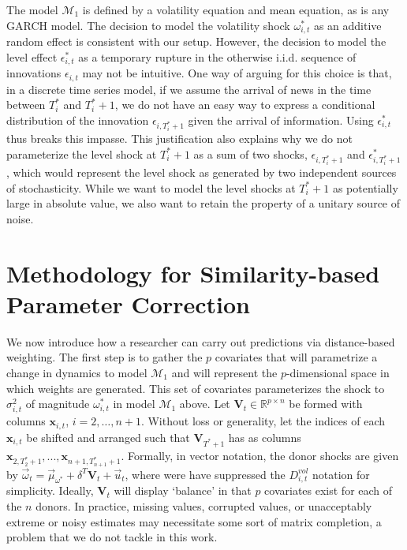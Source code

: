 \documentclass{uiucthesis2021}
\newcommand{\x}{\textbf{x}}
\def\mc#1{\mathcal{#1}} %
\def\mc#1{\mathcal{#1}}
\theoremstyle{definition}
\begin{document}
The model $\mc{M}_1$ is defined by a volatility equation and mean equation, as is any GARCH model.  The decision to model the volatility shock $\omega^{*}_{i,t}$ as an additive random effect is consistent with our setup.  However, the decision to model the level effect $\epsilon^{*}_{i,t}$ as a temporary rupture in the otherwise i.i.d. sequence of innovations $\epsilon_{i,t}$ may not be intuitive.  One way of arguing for this choice is that, in a discrete time series model, if we assume the arrival of news in the time between $T_{i}^{*}$ and $T_{i}^{*}+1$, we do not have an easy way to express a conditional distribution of the innovation $\epsilon_{i,T_{i}^{*}+1}$ given the arrival of information.  Using $\epsilon^{*}_{i,t}$ thus breaks this impasse.  This justification also explains why we do not parameterize the level shock at $T_{i}^{*}+1$ as a sum of two shocks, $\epsilon_{i,T_{i}^{*}+1}$ and $\epsilon^{*}_{i,T_{i}^{*}+1}$, which would represent the level shock as generated by two independent sources of stochasticity. While we want to model the level shocks at $T_{i}^{*}+1$ as potentially large in absolute value, we also want to retain the property of a unitary source of noise.


\section{Methodology for Similarity-based Parameter Correction}

We now introduce how a researcher can carry out predictions via distance-based weighting.  The first step is to gather the $p$ covariates that will parametrize a change in dynamics to model $\mc{M}_1$ and will represent the $p$-dimensional space in which weights are generated.  This set of covariates parameterizes the shock to $\sigma^2_{i,t}$  of magnitude $\omega^*_{i,t}$ in model $\mc{M}_{1}$ above.  Let $\textbf{V}_{t} \in \mathbb{R}^{p \times n}$ be formed with columns $\x_{i,t}$, $i = 2,\ldots,n+1$.  Without loss or generality, let the indices of each $\x_{i,t}$ be shifted and arranged such that $\textbf{V}_{T^{*}+1}$ has as columns $\x_{2,T_{2}^{*}+1},...,\x_{n+1,T_{n+1}^{*}+1}$.  Formally, in vector notation, the donor shocks are given by $\vec{\omega}_t = \vec{\mu}_{\omega^{*}} + \delta^{T}\textbf{V}_{t} + \vec{u}_{t}$, 
    where were have suppressed the $D^{vol}_{i,t}$ notation for simplicity.  %
    Ideally, $\textbf{V}_{t}$ will display `balance' in that $p$ covariates exist for each of the $n$ donors.  In practice, missing values, corrupted values, or unacceptably extreme or noisy estimates may necessitate some sort of matrix completion, a problem that we do not tackle in this work.  
\end{document}
